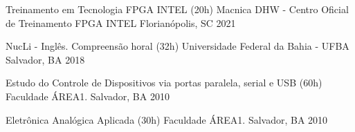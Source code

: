 

\begin{cvhonors}

\cvhonor
  {Treinamento em Tecnologia FPGA INTEL (20h)} %
  {Macnica DHW - Centro Oficial de Treinamento FPGA INTEL} %
  {Florianópolis, SC} %
  {2021} %

  \cvhonor
    {NucLi - Inglês. Compreensão horal (32h)} %
    {Universidade Federal da Bahia - UFBA} %
    {Salvador, BA} %
    {2018} %
    

  \cvhonor
    {Estudo do Controle de Dispositivos via portas paralela, serial e USB (60h)} %
    {Faculdade ÁREA1.} %
    {Salvador, BA} %
    {2010} %

  \cvhonor
    {Eletrônica Analógica Aplicada (30h)} %
    {Faculdade ÁREA1.} %
    {Salvador, BA} %
    {2010} %

\end{cvhonors}
